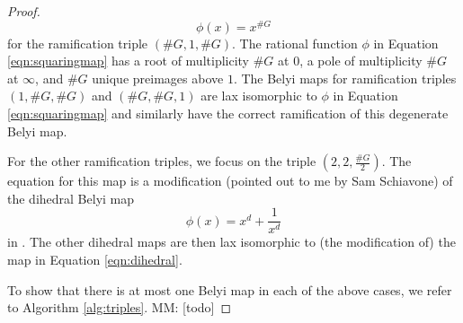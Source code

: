 \documentclass{dcthesis}
\newcommand{\mm}[1]{{\color{blue} \sf MM: [#1]}}
\numberwithin{equation}{section}
\theoremstyle{definition}
\theoremstyle{remark}
\begin{document}
{{\begin{proof}
      \begin{equation}\label{eqn:squaringmap}
        \phi(x) = x^{\#G}
      \end{equation}
      for the ramification triple
      $(\#G, 1, \#G)$.
      The rational function $\phi$ in Equation \ref{eqn:squaringmap}
      has a root of multiplicity $\#G$ at $0$,
      a pole of multiplicity $\#G$ at $\infty$,
      and $\#G$ unique preimages above $1$.
      The Belyi maps for ramification triples
      $(1,\#G, \#G)$ and $(\#G, \#G, 1)$
      are lax isomorphic to $\phi$ in Equation \ref{eqn:squaringmap}
      and similarly have the correct ramification of this
      degenerate Belyi map.
      \par
      For the other ramification triples, we focus on
      the triple $(2,2,\frac{\#G}{2})$.
      The equation for this map is a modification
      (pointed out to me by Sam Schiavone)
      of the dihedral Belyi map
      \begin{equation}\label{eqn:dihedral}
        \phi(x) = x^d+\frac{1}{x^d}
      \end{equation}
      in \cite[Example 5.1.2]{turkishbelyithesis}.
      The other dihedral maps are then lax isomorphic to
      (the modification of) the map in Equation \ref{eqn:dihedral}.
      \par
      To show that there is at most one Belyi map in each of the above cases,
      we refer to Algorithm \ref{alg:triples}.
      \mm{todo}
    \end{proof}
  }
}
\end{document}
